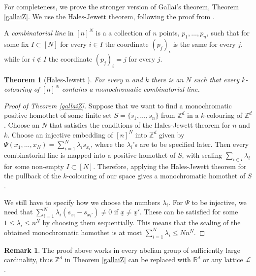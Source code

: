 \documentclass[12pt]{article}
\newcommand{\R}{{\mathbb R}}
\newcommand{\Z}{{\mathbb Z}}
\theoremstyle{plain}
\newtheorem{theorem}{Theorem}
\theoremstyle{definition}
\newtheorem{remark}{Remark}
\begin{document}
For completeness, we prove the stronger version of Gallai's theorem, Theorem \ref{gallaiZ}.
We use the Hales-Jewett theorem, following the proof from \cite{gallaiR}.

A \emph{combinatorial line} in $[n]^N$ is a a collection of $n$ points, $p_1, \ldots, p_n$, such that for some fix $I\subset [N]$ for every $i\in I$ the coordinate $(p_j)_i$ is the same for every $j$, while for $i\notin I$ the coordinate $(p_j)_i=j$ for every $j$.

\begin{theorem}[Hales-Jewett \cite{HalesJewett}]
    For every $n$ and $k$ there is an $N$ such that every $k$-colouring of $[n]^N$ contains a monochromatic combinatorial line.
\end{theorem}



\begin{proof}[Proof of Theorem \ref{gallaiZ}]
Suppose that we want to find a monochromatic positive homothet of some finite set $S=\{s_1,\ldots,s_n\}$ from $\Z^d$ in a $k$-colouring of $\Z^d$.
Choose an $N$ that satisfies the conditions of the Hales-Jewett theorem for $n$ and $k$.
Choose an injective embedding of $[n]^N$ into $\Z^d$ given by $\Psi(x_1,\ldots,x_N)=\sum_{i=1}^N \lambda_is_{x_i}$, where the $\lambda_i$'s are to be specified later.
Then every combinatorial line is mapped into a positive homothet of $S$, with scaling $\sum_{i\in I} \lambda_i$ for some non-empty $I\subset [N]$.
Therefore, applying the Hales-Jewett theorem for the pullback of the $k$-colouring of our space gives a monochromatic homothet of $S$.

We still have to specify how we choose the numbers $\lambda_i$.
For $\Psi$ to be injective, we need that $\sum_{i=1}^N \lambda_i(s_{x_i}-s_{x_i'})\ne 0$ if $\underline x\ne \underline x'$.
These can be satisfied for some $1\le \lambda_i\le n^N$ by choosing them sequentially.
This means that the scaling of the obtained monochromatic homothet is at most $\sum_{i=1}^N \lambda_i\le Nn^N$.
\end{proof}

\begin{remark}
The proof above works in every abelian group of sufficiently large cardinality, thus $\Z^d$ in Theorem \ref{gallaiZ} can be replaced with $\R^d$ or any lattice $\mathcal L$.
\end{remark}
\end{document}
